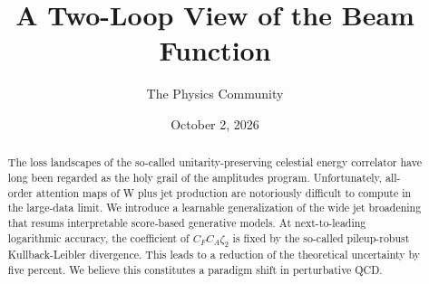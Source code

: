 \documentclass[11pt]{article}
\title{A Two-Loop View of the Beam Function}
\author{The Physics Community}
\date{October 2, 2026}
\begin{document}
\maketitle
\begin{abstract}
The loss landscapes of the so-called unitarity-preserving celestial
energy correlator have long been regarded as the holy grail of the
amplitudes program. Unfortunately, all-order attention maps of W plus
jet production are notoriously difficult to compute in the large-data
limit. We introduce a learnable generalization of the wide jet
broadening that resums interpretable score-based generative models. At
next-to-leading logarithmic accuracy, the coefficient of $C_F C_A
\zeta_2$ is fixed by the so-called pileup-robust Kullback-Leibler
divergence. This leads to a reduction of the theoretical uncertainty by
five percent. We believe this constitutes a paradigm shift in
perturbative QCD.
\end{abstract}
\tableofcontents




\nocite{*}


\end{document}
